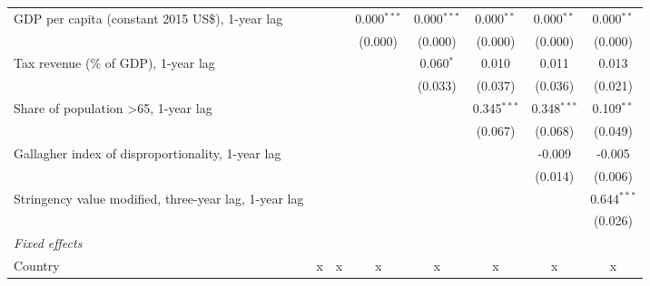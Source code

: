 \begin{tabular}{lccccccc}
   GDP per capita (constant 2015 US\$), 1-year lag                                       &               &         & 0.000$^{***}$ & 0.000$^{***}$ & 0.000$^{**}$  & 0.000$^{**}$  & 0.000$^{**}$\\   
                                                                                         &               &         & (0.000)       & (0.000)       & (0.000)       & (0.000)       & (0.000)\\   
   Tax revenue (\% of GDP), 1-year lag                                                   &               &         &               & 0.060$^{*}$   & 0.010         & 0.011         & 0.013\\   
                                                                                         &               &         &               & (0.033)       & (0.037)       & (0.036)       & (0.021)\\   
   Share of population >65, 1-year lag                                                   &               &         &               &               & 0.345$^{***}$ & 0.348$^{***}$ & 0.109$^{**}$\\   
                                                                                         &               &         &               &               & (0.067)       & (0.068)       & (0.049)\\   
   Gallagher index of disproportionality, 1-year lag                                     &               &         &               &               &               & -0.009        & -0.005\\   
                                                                                         &               &         &               &               &               & (0.014)       & (0.006)\\   
   Stringency value modified, three-year lag, 1-year lag                                 &               &         &               &               &               &               & 0.644$^{***}$\\   
                                                                                         &               &         &               &               &               &               & (0.026)\\   
   \emph{Fixed effects}\\
   Country                                                                               & x             & x       & x             & x             & x             & x             & x\\  

\end{tabular}
